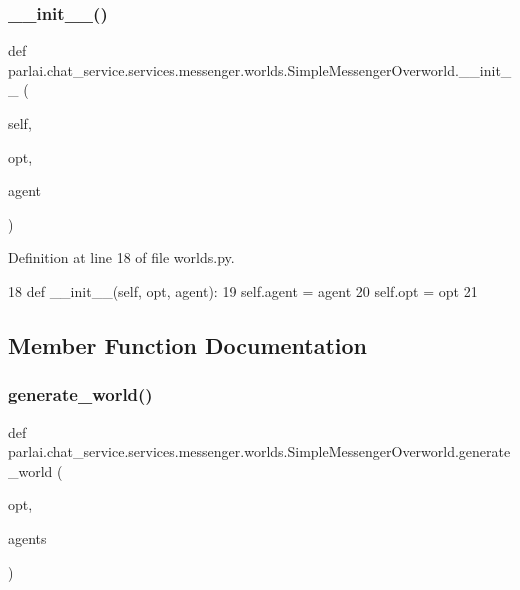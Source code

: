 \subsubsection{\texorpdfstring{\+\_\+\+\_\+init\+\_\+\+\_\+()}{\_\_init\_\_()}}
{\footnotesize\ttfamily def parlai.\+chat\+\_\+service.\+services.\+messenger.\+worlds.\+Simple\+Messenger\+Overworld.\+\_\+\+\_\+init\+\_\+\+\_\+ (\begin{DoxyParamCaption}\item[{}]{self,  }\item[{}]{opt,  }\item[{}]{agent }\end{DoxyParamCaption})}



Definition at line 18 of file worlds.\+py.


\begin{DoxyCode}
18     \textcolor{keyword}{def }\_\_init\_\_(self, opt, agent):
19         self.agent = agent
20         self.opt = opt
21 
\end{DoxyCode}


\subsection{Member Function Documentation}
\mbox{\label{classparlai_1_1chat__service_1_1services_1_1messenger_1_1worlds_1_1SimpleMessengerOverworld_acf14afbe11a177033a4bfd0eed040f83}} 
\subsubsection{\texorpdfstring{generate\+\_\+world()}{generate\_world()}}
{\footnotesize\ttfamily def parlai.\+chat\+\_\+service.\+services.\+messenger.\+worlds.\+Simple\+Messenger\+Overworld.\+generate\+\_\+world (\begin{DoxyParamCaption}\item[{}]{opt,  }\item[{}]{agents }\end{DoxyParamCaption})\hspace{0.3cm}{\ttfamily [static]}}



